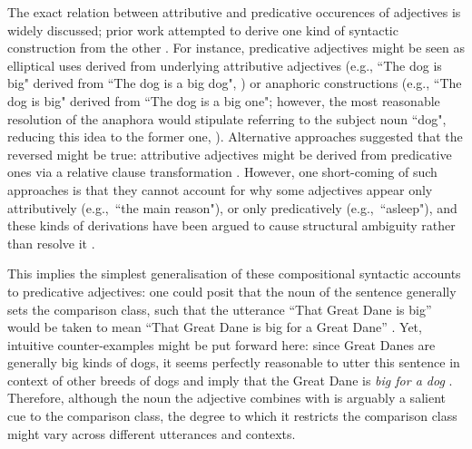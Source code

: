 The exact relation between attributive and predicative occurences of adjectives is widely discussed; prior work attempted to derive one kind of syntactic construction from the other \parencite[e.g.,][]{Cresswell1976}. For instance, predicative adjectives might be seen as elliptical uses derived from underlying attributive adjectives (e.g., ``The dog is big" derived from ``The dog is a big dog", \textcite[cf.][]{Kamp1975}) or anaphoric constructions (e.g., ``The dog is big" derived from ``The dog is a big one"; however, the most reasonable resolution of the anaphora would stipulate referring to the subject noun ``dog", reducing this idea to the former one, \textcite[cf.][]{goldberg2017one}). 
Alternative approaches suggested that the reversed might be true: attributive adjectives might be derived from predicative ones via a relative clause transformation \parencite[``I bought the table. The table was big. $\rightarrow$ I bought the table that was big. $\rightarrow$ I bought the table big. $\rightarrow$ I bought the big table.";][p. 2]{bolinger1967adjectives}. However, one short-coming of such approaches is that they cannot account for why some adjectives appear only attributively (e.g.,~``the main reason"), or only predicatively (e.g.,~``asleep"), and these kinds of derivations have been argued to cause structural ambiguity rather than resolve it \parencite{bolinger1967adjectives}.

This implies the simplest generalisation of these compositional syntactic accounts to predicative adjectives: one could posit that the noun of the sentence generally sets the comparison class, such that the utterance “That Great Dane is big” would be taken to mean “That Great Dane is big for a Great Dane” \parencite{tessler2020}. Yet, intuitive counter-examples might be put forward here: since Great Danes are generally big kinds of dogs, it seems perfectly reasonable to utter this sentence in context of other breeds of dogs and imply that the Great Dane is \emph{big for a dog} \parencite{tessler2017warm}. 
Therefore, although the noun the adjective combines with is arguably a salient cue to the comparison class, the degree to which it restricts the comparison class might vary across different utterances and contexts.   

